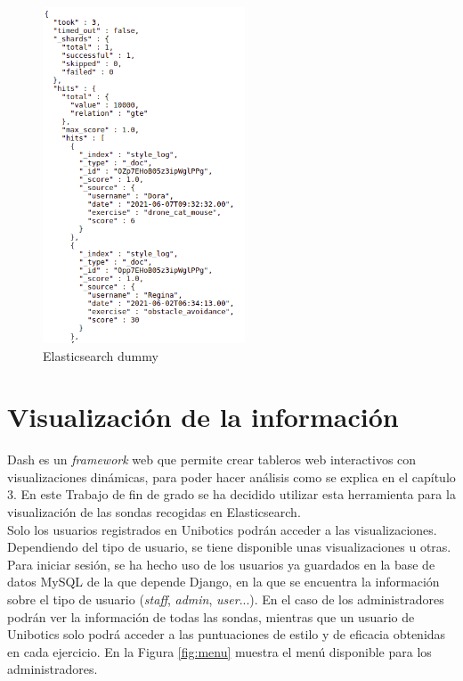 \begin{figure}[H]
    \centering
    \includegraphics[width=6cm, keepaspectratio]{img/dummy.png}
    \caption{Elasticsearch dummy}
    \label{fig:dummy}
\end{figure}

\section{Visualización de la información}

Dash es un \textit{framework} web que permite crear tableros web interactivos con visualizaciones dinámicas, para poder hacer análisis como se explica en el capítulo 3. En este Trabajo de fin de grado se ha decidido utilizar esta herramienta para la visualización de las sondas recogidas en Elasticsearch.\\

Solo los usuarios registrados en Unibotics podrán acceder a las visualizaciones. Dependiendo del tipo de usuario, se tiene disponible unas visualizaciones u otras. Para iniciar sesión, se ha hecho uso de los usuarios ya guardados en la base de datos MySQL de la que depende Django, en la que se encuentra la información sobre el tipo de usuario (\textit{staff}, \textit{admin}, \textit{user}...). En el caso de los administradores podrán ver la información de todas las sondas, mientras que un usuario de Unibotics solo podrá acceder a las puntuaciones de estilo y de eficacia obtenidas en cada ejercicio. En la Figura \ref{fig:menu} muestra el menú disponible para los administradores.

